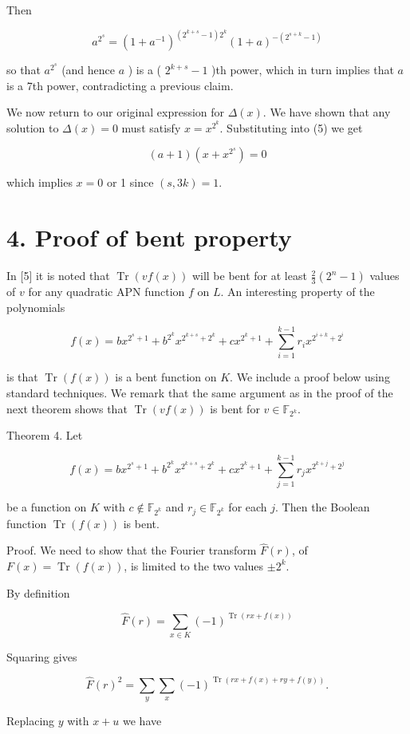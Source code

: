 \documentclass[10pt]{article}
\begin{document}
Then

$$
a^{2^{s}}=\left(1+a^{-1}\right)^{\left(2^{k+s}-1\right) 2^{k}}(1+a)^{-\left(2^{s+k}-1\right)}
$$

so that $a^{2^{s}}$ (and hence $a$ ) is a ( $2^{k+s}-1$ )th power, which in turn implies that $a$ is a 7th power, contradicting a previous claim.

We now return to our original expression for $\Delta(x)$. We have shown that any solution to $\Delta(x)=0$ must satisfy $x=x^{2^{k}}$. Substituting into (5) we get

$$
(a+1)\left(x+x^{2^{s}}\right)=0
$$

which implies $x=0$ or 1 since $(s, 3 k)=1$.

\section*{4. Proof of bent property}
In [5] it is noted that $\operatorname{Tr}(v f(x))$ will be bent for at least $\frac{2}{3}\left(2^{n}-1\right)$ values of $v$ for any quadratic APN function $f$ on $L$. An interesting property of the polynomials

$$
f(x)=b x^{2^{s}+1}+b^{2^{k}} x^{2^{k+s}+2^{k}}+c x^{2^{k}+1}+\sum_{i=1}^{k-1} r_{i} x^{2^{i+k}+2^{i}}
$$

is that $\operatorname{Tr}(f(x))$ is a bent function on $K$. We include a proof below using standard techniques. We remark that the same argument as in the proof of the next theorem shows that $\operatorname{Tr}(v f(x))$ is bent for $v \in \mathbb{F}_{2^{k}}$.

Theorem 4. Let

$$
f(x)=b x^{2^{s}+1}+b^{2^{k}} x^{2^{k+s}+2^{k}}+c x^{2^{k}+1}+\sum_{j=1}^{k-1} r_{j} x^{2^{k+j}+2^{j}}
$$

be a function on $K$ with $c \notin \mathbb{F}_{2^{k}}$ and $r_{j} \in \mathbb{F}_{2^{k}}$ for each $j$. Then the Boolean function $\operatorname{Tr}(f(x))$ is bent.

Proof. We need to show that the Fourier transform $\widehat{F}(r)$, of $F(x)=\operatorname{Tr}(f(x))$, is limited to the two values $\pm 2^{k}$.

By definition

$$
\widehat{F}(r)=\sum_{x \in K}(-1)^{\operatorname{Tr}(r x+f(x))}
$$

Squaring gives

$$
\widehat{F}(r)^{2}=\sum_{y} \sum_{x}(-1)^{\operatorname{Tr}(r x+f(x)+r y+f(y))} .
$$

Replacing $y$ with $x+u$ we have
\end{document}
